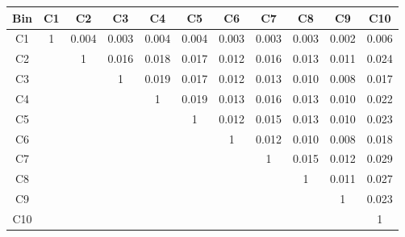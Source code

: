 \begin{tabular}{c@{~~~}c@{~~}c@{~~}c@{~~}c@{~~}c@{~~}c@{~~}c@{~~}c@{~~}c@{~~}c}
\hline 
 \hline 
Bin	& C1 & C2 & C3 & C4 & C5 & C6 & C7 & C8 & C9 & C10 \\ 
\hline 
C1	&  1 &  0.004 &  0.003 &  0.004 &  0.004 &  0.003 &  0.003 &  0.003 &  0.002 &  0.006 \\  
C2	&   &  1 &  0.016 &  0.018 &  0.017 &  0.012 &  0.016 &  0.013 &  0.011 &  0.024 \\  
C3	&   &   &  1 &  0.019 &  0.017 &  0.012 &  0.013 &  0.010 &  0.008 &  0.017 \\  
C4	&   &   &   &  1 &  0.019 &  0.013 &  0.016 &  0.013 &  0.010 &  0.022 \\  
C5	&   &   &   &   &  1 &  0.012 &  0.015 &  0.013 &  0.010 &  0.023 \\  
C6	&   &   &   &   &   &  1 &  0.012 &  0.010 &  0.008 &  0.018 \\  
C7	&   &   &   &   &   &   &  1 &  0.015 &  0.012 &  0.029 \\  
C8	&   &   &   &   &   &   &   &  1 &  0.011 &  0.027 \\  
C9	&   &   &   &   &   &   &   &   &  1 &  0.023 \\  
C10	&   &   &   &   &   &   &   &   &   &  1 \\  
\hline 
 \hline 
\end{tabular}